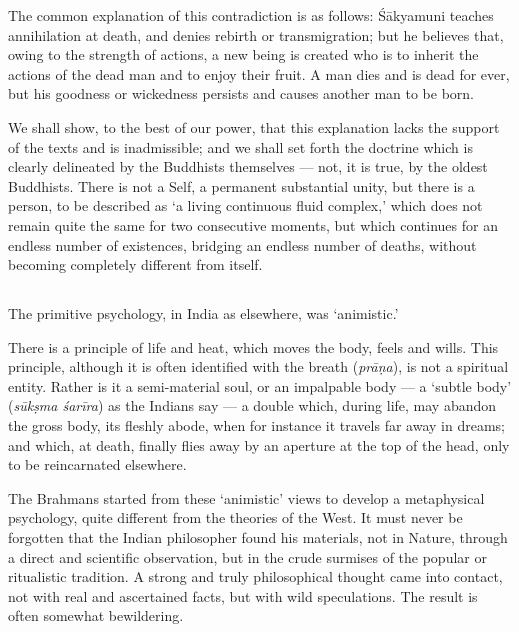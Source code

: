 \documentclass[a4paper, 11pt, oneside, english]{article}
\begin{document}
The common explanation of this contradiction is as follows: Śākyamuni teaches annihilation at death, and denies rebirth or transmigration; but he believes that, owing to the strength of actions, a new being is created who is to inherit the actions of the dead man and to enjoy their fruit. A man dies and is dead for ever, but his goodness or wickedness persists and causes another man to be born.

We shall show, to the best of our power, that this explanation lacks the support of the texts and is inadmissible; and we shall set forth the doctrine which is clearly delineated by the Buddhists themselves --- not, it is true, by the oldest Buddhists. There is not a Self, a permanent substantial unity, but there is a person, to be described as `a living continuous fluid complex,' which does not remain quite the same for two consecutive moments, but which continues for an endless number of existences, bridging an endless number of deaths, without becoming completely different from itself.

\subsection{}
\paragraph{}
The primitive psychology, in India as elsewhere, was `animistic.'

There is a principle of life and heat, which moves the body, feels and wills. This principle, although it is often identified with the breath (\emph{prāṇa}), is not a spiritual entity. Rather is it a semi-material soul, or an impalpable body --- a `subtle body' (\emph{sūkṣma śarīra}) as the Indians say --- a double which, during life, may abandon the gross body, its fleshly abode, when for instance it travels far away in dreams; and which, at death, finally flies away by an aperture at the top of the head, only to be reincarnated elsewhere.

The Brahmans started from these `animistic' views to develop a metaphysical psychology, quite different from the theories of the West. It must never be forgotten that the Indian philosopher found his materials, not in Nature, through a direct and scientific observation, but in the crude surmises of the popular or ritualistic tradition. A strong and truly philosophical thought came into contact, not with real and ascertained facts, but with wild speculations. The result is often somewhat bewildering.
\end{document}
